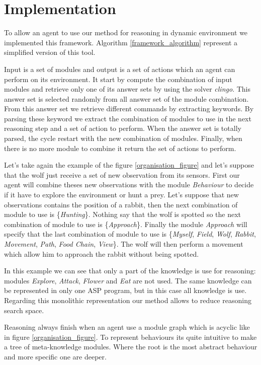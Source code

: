 \documentclass{aamas2012}
\begin{document}
\section{Implementation}

	To allow an agent to use our method for reasoning in dynamic environment we implemented this framework.
	Algorithm \ref{framework_algorithm} represent a simplified version of this tool.
	
	Input is a set of modules and output is a set of actions which an agent can perform on its environment.
	It start by compute the combination of input modules and retrieve only one of its answer sets by using the solver \emph{clingo}.
	This answer set is selected randomly from all answer set of the module combination.
	From this answer set we retrieve different commands by extracting keywords.
	By parsing these keyword we extract the combination of modules to use in the next reasoning step and a set of action to perform.
	When the answer set is totally parsed, the cycle restart with the new combination of modules.
	Finally, when there is no more module to combine it return the set of actions to perform.

	Let's take again the example of the figure \ref{organisation_figure} and let's suppose that the wolf just receive a set of new observation from its sensors.
	First our agent will combine theses new observations with the module \emph{Behaviour} to decide if it have to explore the environment or hunt a prey.
	Let's suppose that new observations contains the position of a rabbit, then the next combination of module to use is \{\emph{Hunting}\}.
	Nothing say that the wolf is spotted so the next combination of module to use is \{\emph{Approach}\}.
	Finally the module \emph{Approach} will specify that the last combination of module to use is 
	\{\emph{Myself}, \emph{Field}, \emph{Wolf}, \emph{Rabbit}, \emph{Movement}, \emph{Path}, \emph{Food Chain}, \emph{View}\}.
	The wolf will then perform a movement which allow him to approach the rabbit without being spotted.
	
	In this example we can see that only a part of the knowledge is use for reasoning: 
	modules \emph{Explore}, \emph{Attack}, \emph{Flower} and \emph{Eat} are not used.
	The same knowledge can be represented in only one ASP program, but in this case all knowledge is use.
	Regarding this monolithic representation our method allows to reduce reasoning search space.
	
	Reasoning always finish when an agent use a module graph which is acyclic like in figure \ref{organisation_figure}.
	To represent behaviours its quite intuitive to make a tree of meta-knowledge modules.
	Where the root is the most abstract behaviour and more specific one are deeper.
\end{document}

